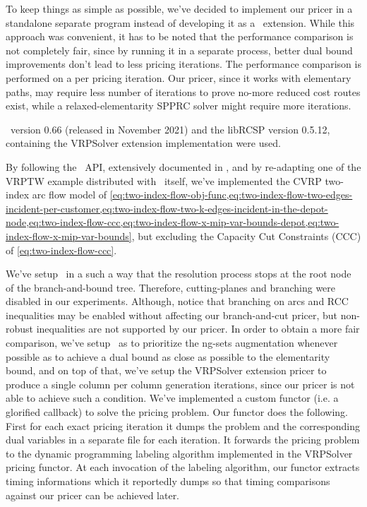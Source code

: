 To keep things as simple as possible, we've decided to implement our
pricer in a standalone separate program instead of developing it as a \bapcod\ extension.
While this approach was convenient, it has to be noted that the performance comparison is not
completely fair, since by running it in a separate process, better dual bound improvements
don't lead to less pricing iterations.
The performance comparison is performed on a per pricing iteration.
Our pricer, since it works with elementary paths, may require less number of iterations
to prove no-more reduced cost routes exist, while a relaxed-elementarity SPPRC solver
might require more iterations.

\bapcod\ version 0.66 (released in November 2021) and the libRCSP version 0.5.12,
containing the VRPSolver extension implementation were used.

By following the \bapcod\ API, extensively documented in \textcite{sadykov2021},
and by re-adapting one of the VRPTW example distributed with \bapcod\ itself,
we've implemented the CVRP two-index arc flow model
of \cref{eq:two-index-flow-obj-func,eq:two-index-flow-two-edges-incident-per-customer,eq:two-index-flow-two-k-edges-incident-in-the-depot-node,eq:two-index-flow-ccc,eq:two-index-flow-x-mip-var-bounds-depot,eq:two-index-flow-x-mip-var-bounds},
but excluding the Capacity Cut Constraints (CCC) of \cref{eq:two-index-flow-ccc}.

We've setup \bapcod\ in a such a way that the resolution process stops at the root
node of the branch-and-bound tree.
Therefore, cutting-planes and branching were disabled in our experiments.
Although, notice that branching on arcs and RCC inequalities may be
enabled without affecting our branch-and-cut pricer, but non-robust
inequalities are not supported by our pricer.
In order to obtain a more fair comparison, we've setup \bapcod\ as to prioritize
the ng-sets augmentation whenever possible as to achieve a dual bound as close
as possible to the elementarity bound, and on top of that,
we've setup the VRPSolver extension pricer to produce a single column
per column generation iterations, since our pricer is not able to achieve
such a condition.
We've implemented a custom functor (i.e. a glorified callback) to solve the pricing problem.
Our functor does the following.
First for each exact pricing iteration it dumps the problem and the corresponding dual variables
in a separate file for each iteration.
It forwards the pricing problem to the dynamic programming labeling algorithm
implemented in the VRPSolver pricing functor.
At each invocation of the labeling algorithm, our functor extracts timing informations
which it reportedly dumps so that timing comparisons against our pricer can be achieved later.


